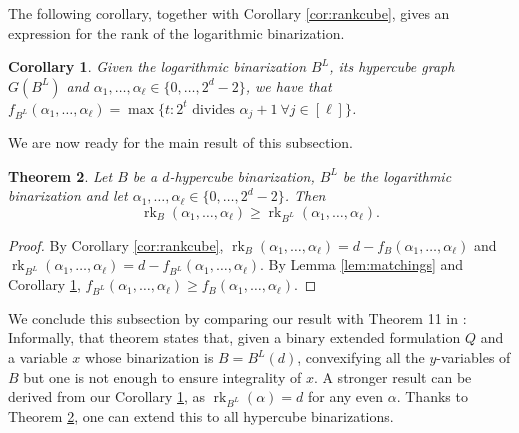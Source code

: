 \documentclass[11pt,a4paper]{article}
\newtheorem{theorem}{Theorem}[section]
\newtheorem{corollary}[theorem]{Corollary}
\newcommand{\1}{\textbf{1}}
\newcommand{\rk}{\operatorname{rk}}
\newcommand\marco[1]{\textcolor{red}{\textbf{ MDS:  #1}}}
\begin{document}
 
 The following corollary, together with Corollary \ref{cor:rankcube}, gives an expression for the rank of the logarithmic binarization.


\begin{corollary}\label{cor:logrank}
Given the logarithmic binarization $B^L$, its hypercube graph $G(B^L)$  and $\alpha_1,\dots,\alpha_\ell\in\{0,\dots, 2^d-2\}$, we have that $f_{B^L}(\alpha_1,\dots,\alpha_\ell)=\max \{t:2^t\mbox{ divides }\alpha_j+1\:\forall j\in [\ell]\}$.
\end{corollary}




 

We are now ready for the main result of this subsection.
\begin{theorem}\label{thm:logbest}
Let $B$ be a $d$-hypercube binarization, $B^L$ be the logarithmic binarization and let $\alpha_1,\dots,\alpha_\ell\in\{0,\dots,2^d-2\}$. Then \[
\rk_B(\alpha_1,\dots,\alpha_\ell) \geq \rk_{B^{L}}(\alpha_1,\dots,\alpha_\ell).
\]
\end{theorem}
\begin{proof} By Corollary \ref{cor:rankcube},
$\rk_B(\alpha_1,\dots,\alpha_\ell) = d-f_B(\alpha_1,\dots,\alpha_\ell)$ and $\rk_{B^L}(\alpha_1,\dots,\alpha_\ell) = d-f_{B^L}(\alpha_1,\dots,\alpha_\ell)$.
By Lemma  \ref{lem:matchings} and Corollary \ref{cor:logrank},  
$f_{B^L}(\alpha_1,\dots,\alpha_\ell)\ge f_{B}(\alpha_1,\dots,\alpha_\ell)$.
\end{proof}


We conclude this subsection by comparing our result with Theorem 11 in \cite{owen2002value}: Informally, that theorem states that, given a binary extended formulation $Q$ and a variable $x$ whose binarization  is $B=B^L(d)$, convexifying all the $y$-variables of $B$ but one is not enough to ensure integrality of $x$. A stronger result can be derived from our Corollary \ref{cor:logrank}, as $\rk_{B^L}(\alpha)=d$ for any even $\alpha$. Thanks to Theorem \ref{thm:logbest}, one can extend this to all hypercube binarizations. 
\end{document}
